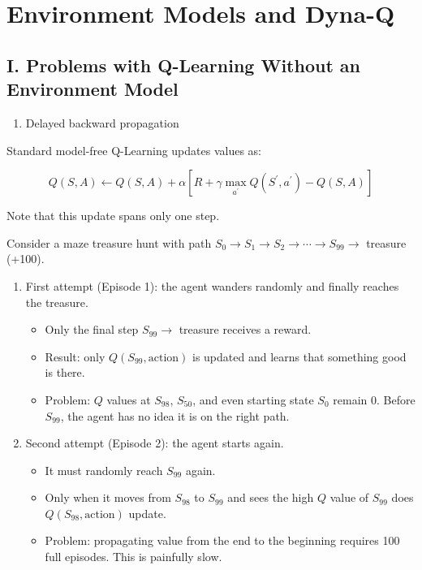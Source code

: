 \setcounter{section}{3}

\hypertarget{environment-models-and-dyna-q}{%
\section{Environment Models and Dyna-Q}\label{environment-models-and-dyna-q}}

\hypertarget{i.-problems-with-q-learning-without-an-environment-model}{%
\subsection{I. Problems with Q-Learning Without an Environment Model}\label{i.-problems-with-q-learning-without-an-environment-model}}

\begin{enumerate}
\def\labelenumi{\arabic{enumi}.}
\tightlist
\item
  Delayed backward propagation
\end{enumerate}

Standard model-free Q-Learning updates values as:

\[
Q(S,A)\leftarrow Q(S,A)+\alpha[R+\gamma\max_{a^{\prime}}Q(S^{\prime},a^{\prime})-Q(S,A)]
\]

Note that this update spans only one step.

Consider a maze treasure hunt with path \(S_0\to S_1\to S_2\to\cdots\to S_{99}\to\) treasure (+100).

\begin{enumerate}
\def\labelenumi{\arabic{enumi}.}
\tightlist
\item
  First attempt (Episode 1): the agent wanders randomly and finally reaches the treasure.

  \begin{itemize}
  \tightlist
  \item
    Only the final step \(S_{99}\to\) treasure receives a reward.
  \item
    Result: only \(Q(S_{99},\text{action})\) is updated and learns that something good is there.
  \item
    Problem: \(Q\) values at \(S_{98}\), \(S_{50}\), and even starting state \(S_0\) remain 0. Before \(S_{99}\), the agent has no idea it is on the right path.
  \end{itemize}
\item
  Second attempt (Episode 2): the agent starts again.

  \begin{itemize}
  \tightlist
  \item
    It must randomly reach \(S_{99}\) again.
  \item
    Only when it moves from \(S_{98}\) to \(S_{99}\) and sees the high \(Q\) value of \(S_{99}\) does \(Q(S_{98},\text{action})\) update.
  \item
    Problem: propagating value from the end to the beginning requires 100 full episodes. This is painfully slow.
  \end{itemize}
\end{enumerate}

